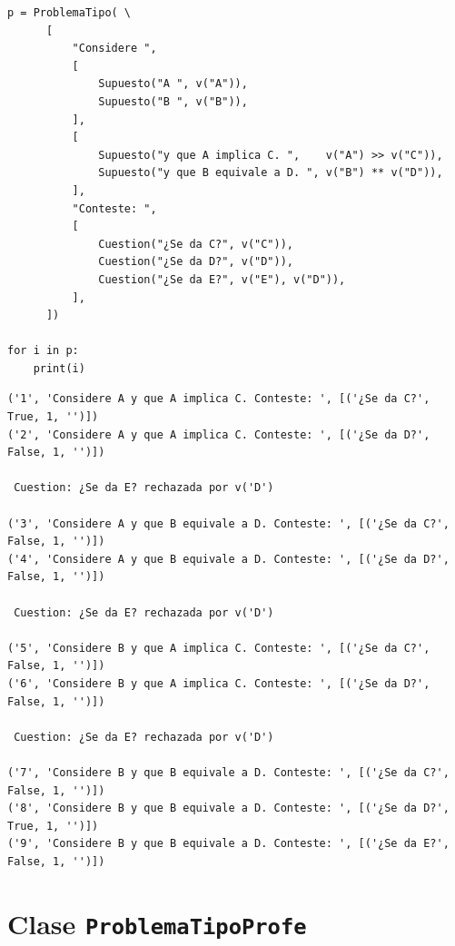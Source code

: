 \documentclass[10pt,a4paper]{report}
\begin{document}
\begin{verbatim}
p = ProblemaTipo( \
      [
          "Considere ",
          [
              Supuesto("A ", v("A")),
              Supuesto("B ", v("B")),
          ],
          [
              Supuesto("y que A implica C. ",    v("A") >> v("C")),
              Supuesto("y que B equivale a D. ", v("B") ** v("D")),
          ],
          "Conteste: ",
          [
              Cuestion("¿Se da C?", v("C")),
              Cuestion("¿Se da D?", v("D")),
              Cuestion("¿Se da E?", v("E"), v("D")),
          ],
      ])

for i in p:
    print(i)
\end{verbatim}

\label{}
\begin{verbatim}
('1', 'Considere A y que A implica C. Conteste: ', [('¿Se da C?', True, 1, '')])
('2', 'Considere A y que A implica C. Conteste: ', [('¿Se da D?', False, 1, '')])

 Cuestion: ¿Se da E? rechazada por v('D')

('3', 'Considere A y que B equivale a D. Conteste: ', [('¿Se da C?', False, 1, '')])
('4', 'Considere A y que B equivale a D. Conteste: ', [('¿Se da D?', False, 1, '')])

 Cuestion: ¿Se da E? rechazada por v('D')

('5', 'Considere B y que A implica C. Conteste: ', [('¿Se da C?', False, 1, '')])
('6', 'Considere B y que A implica C. Conteste: ', [('¿Se da D?', False, 1, '')])

 Cuestion: ¿Se da E? rechazada por v('D')

('7', 'Considere B y que B equivale a D. Conteste: ', [('¿Se da C?', False, 1, '')])
('8', 'Considere B y que B equivale a D. Conteste: ', [('¿Se da D?', True, 1, '')])
('9', 'Considere B y que B equivale a D. Conteste: ', [('¿Se da E?', False, 1, '')])
\end{verbatim}
\section{Clase \texttt{ProblemaTipoProfe}}
\label{sec:orgdbd3c5e}
\end{document}
